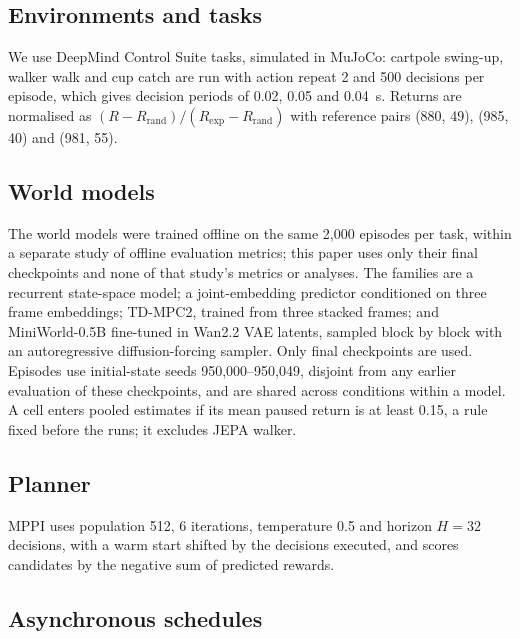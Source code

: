\documentclass[pdflatex,sn-nature]{sn-jnl}%
\begin{document}
\subsection{Environments and tasks}\label{sec:envs}

We use DeepMind Control Suite tasks\cite{tassa2018dmc}, simulated in MuJoCo\cite{todorov2012mujoco}: cartpole swing-up, walker walk and cup catch are run with action repeat 2 and 500 decisions per episode, which gives decision periods of 0.02, 0.05 and 0.04~s. Returns are normalised as $(R-R_{\mathrm{rand}})/(R_{\mathrm{exp}}-R_{\mathrm{rand}})$ with reference pairs (880, 49), (985, 40) and (981, 55).

\subsection{World models}\label{sec:models}

The world models were trained offline on the same 2,000 episodes per task\cite{xia2026metrictrust}, within a separate study of offline evaluation metrics; this paper uses only their final checkpoints and none of that study's metrics or analyses. The families are a recurrent state-space model\cite{hafner2019planet}; a joint-embedding predictor conditioned on three frame embeddings\cite{maes2026lewm}; TD-MPC2\cite{hansen2023tdmpc2}, trained from three stacked frames; and MiniWorld-0.5B\cite{zhao2026miniworld} fine-tuned in Wan2.2 VAE latents\cite{wan2025}, sampled block by block with an autoregressive diffusion-forcing sampler\cite{chen2024diffusionforcing}. Only final checkpoints are used. Episodes use initial-state seeds 950,000--950,049, disjoint from any earlier evaluation of these checkpoints, and are shared across conditions within a model. A cell enters pooled estimates if its mean paused return is at least 0.15, a rule fixed before the runs; it excludes JEPA walker.

\subsection{Planner}\label{sec:planner}

MPPI\cite{williams2017mppi} uses population 512, 6 iterations, temperature 0.5 and horizon $H=32$ decisions, with a warm start shifted by the decisions executed, and scores candidates by the negative sum of predicted rewards.

\subsection{Asynchronous schedules}\label{sec:async}
\end{document}
